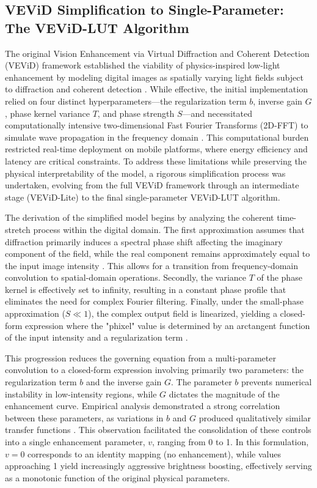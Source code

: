 \documentclass[journal,transmag]{IEEEtran}
\begin{document}
\subsection{VEViD Simplification to Single-Parameter: The VEViD-LUT Algorithm}
The original Vision Enhancement via Virtual Diffraction and Coherent Detection (VEViD) framework established the viability of physics-inspired low-light enhancement by modeling digital images as spatially varying light fields subject to diffraction and coherent detection \cite{jalali2022vevid}. While effective, the initial implementation relied on four distinct hyperparameters—the regularization term $b$, inverse gain $G$, phase kernel variance $T$, and phase strength $S$—and necessitated computationally intensive two-dimensional Fast Fourier Transforms (2D-FFT) to simulate wave propagation in the frequency domain \cite{zhou2024simplification}. This computational burden restricted real-time deployment on mobile platforms, where energy efficiency and latency are critical constraints. To address these limitations while preserving the physical interpretability of the model, a rigorous simplification process was undertaken, evolving from the full VEViD framework through an intermediate stage (VEViD-Lite) to the final single-parameter VEViD-LUT algorithm.

The derivation of the simplified model begins by analyzing the coherent time-stretch process within the digital domain. The first approximation assumes that diffraction primarily induces a spectral phase shift affecting the imaginary component of the field, while the real component remains approximately equal to the input image intensity \cite{zhou2024simplification}. This allows for a transition from frequency-domain convolution to spatial-domain operations. Secondly, the variance $T$ of the phase kernel is effectively set to infinity, resulting in a constant phase profile that eliminates the need for complex Fourier filtering. Finally, under the small-phase approximation ($S \ll 1$), the complex output field is linearized, yielding a closed-form expression where the "phixel" value is determined by an arctangent function of the input intensity and a regularization term \cite{zhou2024simplification}.

This progression reduces the governing equation from a multi-parameter convolution to a closed-form expression involving primarily two parameters: the regularization term $b$ and the inverse gain $G$. The parameter $b$ prevents numerical instability in low-intensity regions, while $G$ dictates the magnitude of the enhancement curve. Empirical analysis demonstrated a strong correlation between these parameters, as variations in $b$ and $G$ produced qualitatively similar transfer functions \cite{zhou2024simplification}. This observation facilitated the consolidation of these controls into a single enhancement parameter, $v$, ranging from 0 to 1. In this formulation, $v=0$ corresponds to an identity mapping (no enhancement), while values approaching 1 yield increasingly aggressive brightness boosting, effectively serving as a monotonic function of the original physical parameters.
\end{document}
